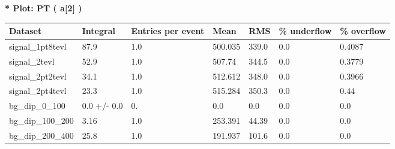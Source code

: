 \documentclass[a4paper, 10pt]{article}
\begin{document}
\textbf{* Plot: PT ( a[2] ) }\\
   \begin{table}[H]
  \begin{center}
    \begin{tabular}{|m{23.0mm}|m{23.0mm}|m{18.0mm}|m{19.0mm}|m{19.0mm}|m{19.0mm}|m{19.0mm}|}
      \hline
      {\cellcolor{yellow}         Dataset}& {\cellcolor{yellow}         Integral}& {\cellcolor{yellow}         Entries per event}& {\cellcolor{yellow}         Mean}& {\cellcolor{yellow}         RMS}& {\cellcolor{yellow}         \% underflow}& {\cellcolor{yellow}         \% overflow}\\
      \hline
      {\cellcolor{white}         signal\_1pt8tevl}& {\cellcolor{white}         87.9}& {\cellcolor{white}         1.0}& {\cellcolor{white}         500.035}& {\cellcolor{white}         339.0}& {\cellcolor{green}         0.0}& {\cellcolor{green}         0.4087}\\
      \hline
      {\cellcolor{white}         signal\_2tevl}& {\cellcolor{white}         52.9}& {\cellcolor{white}         1.0}& {\cellcolor{white}         507.74}& {\cellcolor{white}         344.5}& {\cellcolor{green}         0.0}& {\cellcolor{green}         0.3779}\\
      \hline
      {\cellcolor{white}         signal\_2pt2tevl}& {\cellcolor{white}         34.1}& {\cellcolor{white}         1.0}& {\cellcolor{white}         512.612}& {\cellcolor{white}         348.0}& {\cellcolor{green}         0.0}& {\cellcolor{green}         0.3966}\\
      \hline
      {\cellcolor{white}         signal\_2pt4tevl}& {\cellcolor{white}         23.3}& {\cellcolor{white}         1.0}& {\cellcolor{white}         515.284}& {\cellcolor{white}         350.3}& {\cellcolor{green}         0.0}& {\cellcolor{green}         0.44}\\
      \hline
      {\cellcolor{white}         bg\_dip\_0\_100}& {\cellcolor{white}         0.0 +/\-- 0.0}& {\cellcolor{white}         0.}& {\cellcolor{white}         0.0}& {\cellcolor{white}         0.0}& {\cellcolor{green}         0.0}& {\cellcolor{green}         0.0}\\
      \hline
      {\cellcolor{white}         bg\_dip\_100\_200}& {\cellcolor{white}         3.16}& {\cellcolor{white}         1.0}& {\cellcolor{white}         253.391}& {\cellcolor{white}         44.39}& {\cellcolor{green}         0.0}& {\cellcolor{green}         0.0}\\
      \hline
      {\cellcolor{white}         bg\_dip\_200\_400}& {\cellcolor{white}         25.8}& {\cellcolor{white}         1.0}& {\cellcolor{white}         191.937}& {\cellcolor{white}         101.6}& {\cellcolor{green}         0.0}& {\cellcolor{green}         0.0}\\

\end{tabular}
\end{center}
\end{table}
\end{document}
